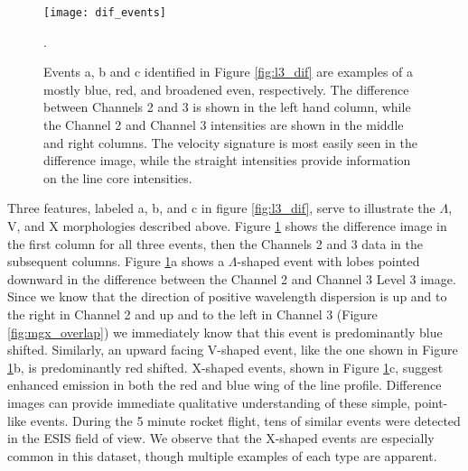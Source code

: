    	
 		\begin{figure}[htb!]
  			\centering
  			\texttt{[image: dif\_events]}
  			\caption{Events a, b and c identified in Figure \ref{fig:l3_dif} are examples of a mostly blue, red, and broadened even, respectively. The difference between Channels 2 and 3 is shown in the left hand column, while the Channel 2 and Channel 3 intensities are shown in the middle and right columns.  The velocity signature is most easily seen in the difference image, while the straight intensities provide information on the line core intensities. 
  			}
  			\label{fig:dif_events}. 
  		\end{figure}

    	
    	Three features, labeled a, b, and c in figure \ref{fig:l3_dif}, serve to illustrate the $\Lambda$, V, and X morphologies described above.
    	Figure \ref{fig:dif_events} shows the difference image in the first column for all three events, then the Channels 2 and 3 data in the subsequent columns. 
    	Figure \ref{fig:dif_events}a shows a $\Lambda$-shaped event with lobes pointed downward in the difference between the Channel 2 and Channel 3 Level 3 image.
    	Since we know that the direction of positive wavelength dispersion is up and to the right in Channel 2 and up and to the left in Channel 3 (Figure \ref{fig:mgx_overlap}) we immediately know that this event is predominantly blue shifted.  
    	Similarly, an upward facing V-shaped event, like the one shown in Figure \ref{fig:dif_events}b, is predominantly red shifted.
    	X-shaped events, shown in Figure \ref{fig:dif_events}c, suggest enhanced emission in both the red and blue wing of the line profile. 
    	Difference images can provide immediate qualitative understanding of these simple, point-like events.  
    	During the 5 minute rocket flight, tens of similar events were detected in the ESIS field of view.  
    	We observe that the X-shaped events are especially common in this dataset, though multiple examples of each 
    	type are apparent.
    	
